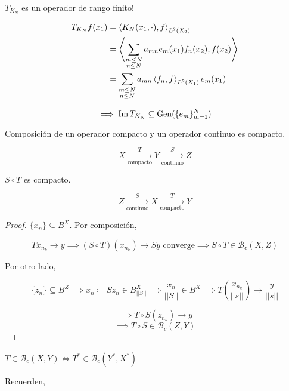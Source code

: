 \begin{fexample}
   $T_{K_N}$ es un operador de rango finito!

   \begin{align*}
       T_{K_N} f(x_1)&=\left\langle K_N(x_1,\cdot),f\right\rangle_{L^2(X_2)}\\
       &=\left\langle \sum_{\substack{m\leq N\\n\leq N}}a_{mn}e_m(x_1)f_n(x_2),f(x_2)\right\rangle\\
       &=\sum_{\substack{m\leq N\\n\leq N}}a_{mn}\left\langle f_n,f\right\rangle_{L^2(X_1)}e_m(x_1)
   \end{align*}

   \[\implies \operatorname{Im} T_{K_N}\subseteq \operatorname{Gen}(\{e_m\}_{m=1}^N)\]
\end{fexample}

\begin{fproposition}
   Composición de un operador compacto y un operador continuo es compacto.

   \[X\xrightarrow[\text{compacto}]{T}Y\xrightarrow[\text{continuo}]{S} Z\]

   $S\circ T$ es compacto.

   \[Z\xrightarrow[\text{continuo}]{S}X\xrightarrow[\text{compacto}]{T} Y\]
\end{fproposition}

\begin{proof}
   $\{x_n\}\subseteq B^X$. Por composición,

   \[Tx_{n_k}\to y\implies (S\circ T)(x_{n_k})\to Sy\text{ converge}\implies S\circ T\in\mathcal{B}_c(X,Z)\]

   Por otro lado,
   
   \[\{z_n\}\subseteq B^Z\implies x_n\coloneqq S z_n\in B_{||S||}^X\implies \frac{x_n}{||S||}\in B^X\implies T(\frac{x_{n_k}}{||s||})\to \frac{y}{||s||}\]

   \[\implies T\circ S(z_{n_k})\to y\]
   \[\implies T\circ S\in \mathcal{B}_c(Z,Y)\]
\end{proof}

\begin{ftheorem}[Schauder]
   $T\in \mathcal{B}_c(X,Y)\iff T^*\in\mathcal{B}_c(Y^*,X^*)$
\end{ftheorem}

Recuerden,

